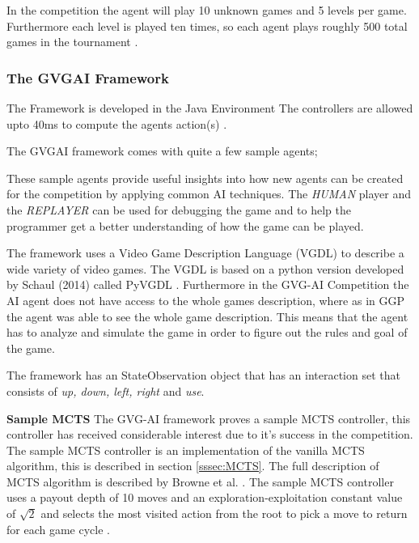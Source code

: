 \documentclass[journal]{IEEEtran}
\begin{document}
		In the competition the agent will play 10 unknown games and 5 levels per game. Furthermore each level is played ten times, so each agent plays roughly 500 total games in the tournament \cite{schuster2015mcts}.
		
	
	
	\subsubsection{The GVGAI Framework}
		The Framework is developed in the Java Environment 
		The controllers are allowed upto 40ms to compute the agents action(s) \cite{perez2016GVGAICompetition, GVGAI}.
		
		The GVGAI framework comes with quite a few sample agents;
		

		These sample agents provide useful insights into how new agents can be created for the competition by applying common AI techniques.
		The \textit{HUMAN} player and the \textit{REPLAYER} can be used for debugging the game and to help the programmer get a better understanding of how the game can be played.
		
		
		The framework uses a Video Game Description Language (VGDL) to describe a wide variety of video games. The VGDL is based on a python version developed by Schaul (2014) called PyVGDL \cite{schuster2015mcts}. Furthermore in the GVG-AI Competition the AI agent does not have access to the whole games description, where as in GGP the agent was able to see the whole game description. This means that the agent has to analyze and simulate the game in order to figure out the rules and goal of the game.
		
		
		The framework has an StateObservation object that has an interaction set that consists of \textit{up, down, left, right} and \textit{use}.


		
		\textbf{Sample MCTS} \label{sssec:sampleMCTS}
			The GVG-AI framework proves a sample MCTS controller, this controller has received considerable interest due to it's success in the competition. 
			The sample MCTS controller is an implementation of the vanilla MCTS algorithm, this is described in section \ref{sssec:MCTS}. 
			The full description of MCTS algorithm is described by Browne et al. \cite{browne2012survey}.
			The sample MCTS controller uses a payout depth of 10 moves and an exploration-exploitation constant value of $\sqrt{2}$ and selects the most visited action from the root to pick a move to return for each game cycle \cite{perez20162014}.
\end{document}

